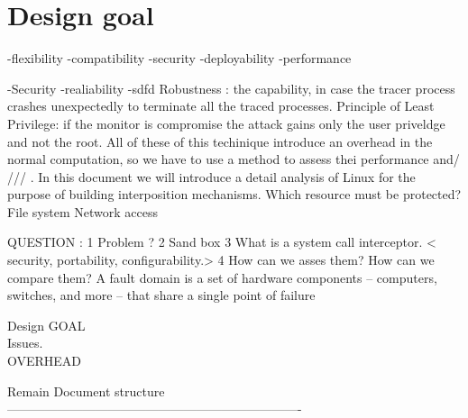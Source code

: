 \section{Design goal} 
-flexibility 
-compatibility 
-security
-deployability
-performance

-Security 
-realiability 
-sdfd
Robustness : the capability, in case the tracer process crashes unexpectedly to terminate all the traced processes.  
Principle of Least Privilege: 	 if the monitor is compromise the attack gains only the user priveldge and not the root. 
All of these of this techinique introduce an overhead in the normal computation, so we have to use a method to assess thei performance and/ ///
. In this document we will introduce a detail analysis of Linux for the purpose of building interposition mechanisms. 
Which resource must be protected? 
	File system
	Network access 

QUESTION :  
1	Problem ?
2	Sand box 
3	What is a system call interceptor.
	< security, portability, configurability.>
4	How can we asses them? How can we compare them?
A fault domain is a set of hardware components – computers, switches, and more – that share a single point of failure


Design GOAL  \\
% 

Issues. \\ 
OVERHEAD 

Remain Document structure  \\ 

 ----------------------------------------------------------------------

